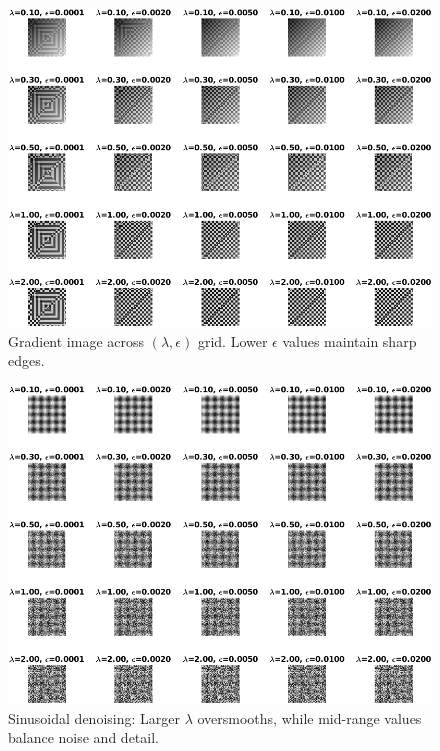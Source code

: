 \documentclass[11pt]{article}
\begin{document}
\begin{figure}[h!]
\centering
\includegraphics[width=\textwidth]{../utils/results/test_grid_5x5/gradient_grid.png}
\caption{Gradient image across \((\lambda, \epsilon)\) grid. Lower \(\epsilon\) values maintain sharp edges.}
\end{figure}

\begin{figure}[h!]
\centering
\includegraphics[width=\textwidth]{../utils/results/test_grid_5x5/sinusoidal_grid.png}
\caption{Sinusoidal denoising: Larger \(\lambda\) oversmooths, while mid-range values balance noise and detail.}
\end{figure}
\end{document}
